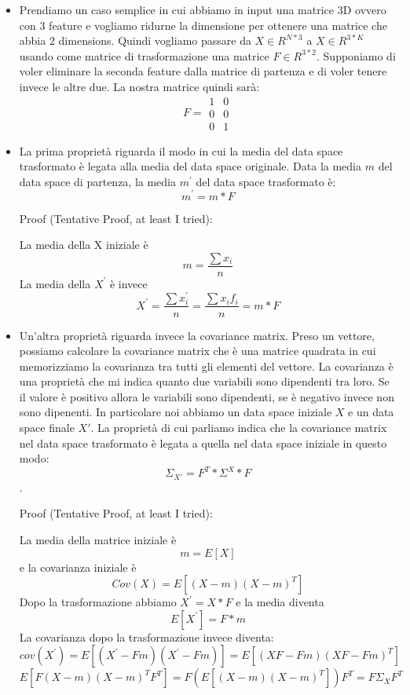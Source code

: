 \documentclass[14pt]{extreport}
\begin{document}
\begin{itemize}
\item Prendiamo un caso semplice in cui abbiamo in input una matrice 3D ovvero con 3 feature e vogliamo ridurne la dimensione
per ottenere una matrice che abbia 2 dimensions. Quindi vogliamo passare da $X \in R^{N*3}$ a $X \in R^{3*K}$ usando come matrice di
trasformazione una matrice $F \in R^{3*2}$.
Supponiamo di voler eliminare la seconda feature dalla matrice di partenza e di voler tenere invece le altre due.
La nostra matrice quindi sarà:
\begin{equation}
F = \begin{matrix}
1 & 0\\
0 & 0\\
0 & 1
\end{matrix}
\end{equation}
\item La prima proprietà riguarda il modo in cui la media del data space trasformato è legata alla media del data space originale.
Data la media $m$ del data space di partenza, la media $m^{'}$ del data space trasformato è:
$$m^{'} = m * F$$

Proof (Tentative Proof, at least I tried):

La media della X iniziale è $$m = \frac{\sum x_i}{n}$$
La media della $X^{'}$ è invece $$X^{'} = \frac{\sum x_i^{'}}{n} = \frac{\sum x_i f_i}{n} = m*F$$

\item Un'altra proprietà riguarda invece la covariance matrix. Preso un vettore, possiamo calcolare la covariance matrix che è una
matrice quadrata in cui memorizziamo la covarianza tra tutti gli elementi del vettore. La covarianza è una proprietà che mi indica quanto
due variabili sono dipendenti tra loro. Se il valore è positivo allora le variabili sono dipendenti, se è negativo invece non sono dipenenti.
In particolare noi abbiamo un data space iniziale $X$ e un data space finale $X'$. La proprietà di cui parliamo indica che la covariance
matrix nel data space trasformato è legata a quella nel data space iniziale in questo modo:
$$\Sigma_{X'} = F^T*\Sigma^{X}*F$$.

Proof (Tentative Proof, at least I tried):

La media della matrice iniziale è $$m = E[X]$$ e la covarianza iniziale è $$Cov(X) = E[(X-m)(X-m)^T]$$
Dopo la trasformazione abbiamo $X^{'} = X*F$ e la media diventa $$E[X^{'}] = F*m$$
La covarianza dopo la trasformazione invece diventa: $$cov(X^{'}) = E[(X^{'}-Fm)(X^{'}-Fm)] = E[(XF-Fm)(XF-Fm)^T]$$
$$E[F(X-m)(X-m)^{T}F^{T}] = F(E[(X-m)(X-m)^{T}])F^{T} = F\Sigma_{X}F^{T}$$
\end{itemize}
\end{document}
